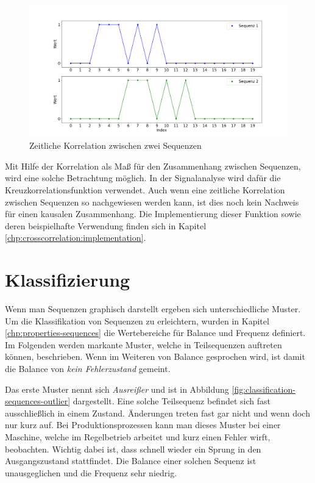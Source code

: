 \begin{figure}[H]
	\centering
	\includegraphics[scale=0.32]{images/sequences/correlation}
	\caption{Zeitliche Korrelation zwischen zwei Sequenzen}
	\label{fig:correlation-sequences-corr}
\end{figure}

Mit Hilfe der Korrelation als Maß für den Zusammenhang zwischen Sequenzen, wird eine solche Betrachtung möglich. In der Signalanalyse wird dafür die Kreuzkorrelationsfunktion verwendet. Auch wenn eine zeitliche Korrelation zwischen Sequenzen so nachgewiesen werden kann, ist dies noch kein Nachweis für einen kausalen Zusammenhang. Die Implementierung dieser Funktion sowie deren beispielhafte Verwendung finden sich in Kapitel \ref{chp:crosscorrelation:implementation}.

\section{Klassifizierung}
\label{chp:classification-sequences}
Wenn man Sequenzen graphisch darstellt ergeben sich unterschiedliche Muster. Um die Klassifikation von Sequenzen zu erleichtern, wurden in Kapitel \ref{chp:properties-sequences} die Wertebereiche für Balance und Frequenz definiert. Im Folgenden werden markante Muster, welche in Teilsequenzen auftreten können, beschrieben. Wenn im Weiteren von Balance gesprochen wird, ist damit die Balance von \textit{kein Fehlerzustand} gemeint.

Das erste Muster nennt sich \textit{Ausreißer} und ist in Abbildung \ref{fig:classification-sequences-outlier} dargestellt. Eine solche Teilsequenz befindet sich fast ausschließlich in einem Zustand. Änderungen treten fast gar nicht und wenn doch nur kurz auf. Bei Produktionsprozessen kann man dieses Muster bei einer Maschine, welche im Regelbetrieb arbeitet und kurz einen Fehler wirft, beobachten. Wichtig dabei ist, dass schnell wieder ein Sprung in den Ausgangszustand stattfindet. Die Balance einer solchen Sequenz ist unausgeglichen und die Frequenz sehr niedrig.

